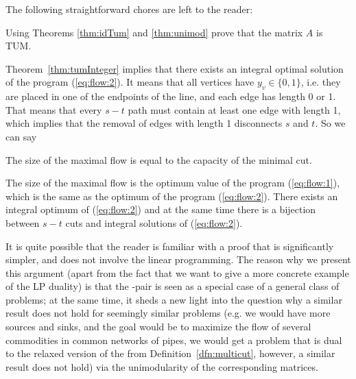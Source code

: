 \noindent
The following straightforward chores are left to the reader:


\begin{prob}
  Using Theorems \ref{thm:idTum} and \ref{thm:unimod} prove that the matrix $A$ is TUM.
\end{prob}


\noindent
Theorem~\ref{thm:tumInteger} implies that there exists an integral optimal solution of the 
program (\ref{eq:flow:2}). It means that all vertices have $y_v\in\{0,1\}$, i.e. they are placed in one of 
the endpoints of the line, and each edge has length 0 or 1. That means that every $s-t$ path must contain at least
one edge with length 1, which implies that the removal of edges with length 1 disconnects $s$ and $t$.
So we can say

\begin{veta}
  The size of the maximal flow is equal to the capacity of the minimal cut.
\end{veta}
\begin{dokaz}
  The size of the maximal flow is the optimum value of the program (\ref{eq:flow:1}), which is the same
  as the optimum of the program  (\ref{eq:flow:2}). There exists an integral optimum of (\ref{eq:flow:2})
  and at the same time there is a bijection between $s-t$ cuts and integral solutions of  (\ref{eq:flow:2}).
\end{dokaz}

\noindent
It is quite possible that the reader is familiar with a proof that is significantly simpler, and does not involve
the linear programming. The reason why we present this argument (apart from the fact that we want to 
give a more concrete  example of the LP duality) is that the \maxflow-\mincut pair is seen as a special case
of a general class of problems; at the same time, it sheds a new light into the question why a similar result 
does not hold for seemingly similar problems (e.g. we would have more sources and sinks, and the goal would be
to maximize the flow of several commodities in common networks of pipes, we would get a problem that is dual to the
relaxed version of the \minmulticut from Definition~\ref{dfn:multicut}, however, a similar result does not hold)
via the unimodularity of the corresponding matrices.
